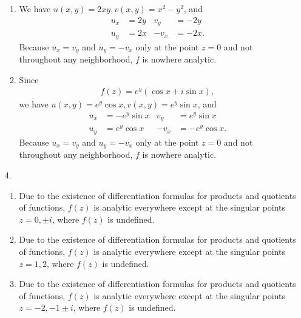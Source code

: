 \documentclass[a4paper,12pt]{article}
\begin{document}
\begin{enumerate}
\begin{enumerate}
            \item
                We have $u(x, y) = 2xy, v(x, y) = x^2 - y^2$, and
                \begin{align*}
                    u_x &= 2y &
                    v_y &= -2y \\
                    u_y &= 2x &
                    -v_x &= -2x.
                \end{align*}
                Because $u_x = v_y$ and $u_y = -v_x$ only at the point $z = 0$ and not throughout any neighborhood, $f$ is nowhere analytic.

            \item
                Since
                \begin{align*}
                    f(z) = e^y (\cos x + i \sin x),
                \end{align*}
                we have $u(x, y) = e^y \cos x, v(x, y) = e^y \sin x$, and
                \begin{align*}
                    u_x &= -e^y \sin x &
                    v_y &= e^y \sin x \\
                    u_y &= e^y \cos x &
                    -v_x &= -e^y \cos x.
                \end{align*}
                Because $u_x = v_y$ and $u_y = -v_x$ only at the point $z = 0$ and not throughout any neighborhood, $f$ is nowhere analytic.
        \end{enumerate}

    \item[4.]
        \begin{enumerate}
            \item
                Due to the existence of differentiation formulas for products and quotients of functions, $f(z)$ is analytic everywhere except at the singular points $z = 0, \pm i$, where $f(z)$ is undefined.

            \item
                Due to the existence of differentiation formulas for products and quotients of functions, $f(z)$ is analytic everywhere except at the singular points $z = 1, 2$, where $f(z)$ is undefined.

            \item
                Due to the existence of differentiation formulas for products and quotients of functions, $f(z)$ is analytic everywhere except at the singular points $z = -2, -1 \pm i$, where $f(z)$ is undefined.
        \end{enumerate}


\end{enumerate}
\end{document}
